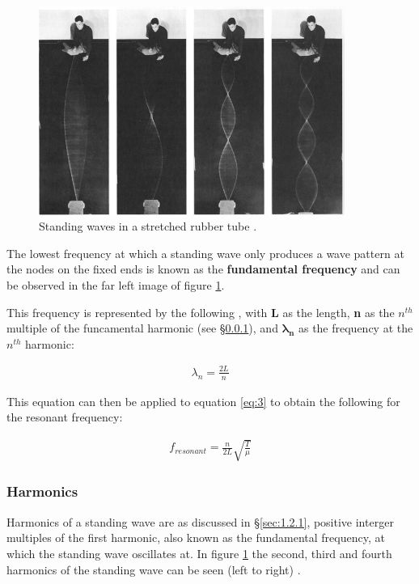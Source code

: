 \documentclass[12pt]{article}
\begin{document}
\begin{figure}[H]
    \centering
    \includegraphics[width=10cm]{standing waves.jpg}
    \caption{\centering Standing waves in a stretched rubber tube \protect\cite{MARION1981341}.}
    \label{fig:stand}
\end{figure}

The lowest frequency at which a standing wave only produces a wave pattern at the nodes on the fixed ends is known as the \textbf{fundamental frequency} and can
be observed in the far left image of figure \ref{fig:stand}.

This frequency is represented by the following \cite{isaacwave,librestand,MARION1981341}, with \textbf{L} as the length, \textbf{n} as the $n^{th}$ multiple of the funcamental harmonic (see §\ref{sec:1.2.2}), and $\mathbf{\lambda_n}$ as
the frequency at the $n^{th}$ harmonic:

\vspace{-1.5ex}
\begin{gather} \label{eq:4}
    \lambda_n = \frac{2L}{n}
\end{gather}

This equation can then be applied to equation \ref{eq:3} to obtain the following for the resonant frequency:

\vspace{-1.5ex}
\begin{gather} \label{eq:5}
    f_{resonant} = \frac{n}{2L} \sqrt{\frac{T}{\mu}}
\end{gather}

\subsubsection{Harmonics} \label{sec:1.2.2}

Harmonics of a standing wave are as discussed in §\ref{sec:1.2.1}, positive interger multiples of the first harmonic, also known as the fundamental frequency, at which the 
standing wave oscillates at. In figure \ref{fig:stand} the second, third and fourth harmonics of the standing wave can be seen (left to right) \cite{MARION1981341}.
\end{document}
